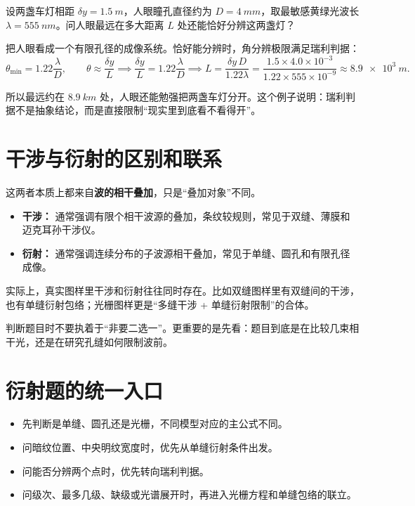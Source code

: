 \documentclass[lang=cn,11pt]{elegantbook}
\begin{document}
\begin{example}[人眼分辨两盏车灯的最远距离]
设两盏车灯相距 \(\delta y=\SI{1.5}{m}\)，人眼瞳孔直径约为 \(D=\SI{4}{mm}\)，取最敏感黄绿光波长 \(\lambda=\SI{555}{nm}\)。问人眼最远在多大距离 \(L\) 处还能恰好分辨这两盏灯？
\end{example}

\begin{solution}
把人眼看成一个有限孔径的成像系统。恰好能分辨时，角分辨极限满足瑞利判据：
\[
\theta_{\min}=1.22\frac{\lambda}{D},\qquad
\theta\approx \frac{\delta y}{L}
\implies
\frac{\delta y}{L}=1.22\frac{\lambda}{D}
\implies
L=\frac{\delta y\,D}{1.22\lambda}
=\frac{1.5\times 4.0\times 10^{-3}}{1.22\times 555\times 10^{-9}}
\approx \SI{8.9e3}{m}.
\]

所以最远约在 \(\SI{8.9}{km}\) 处，人眼还能勉强把两盏车灯分开。这个例子说明：瑞利判据不是抽象结论，而是直接限制“现实里到底看不看得开”。
\end{solution}

\section{干涉与衍射的区别和联系}

这两者本质上都来自\textbf{波的相干叠加}，只是“叠加对象”不同。
\begin{itemize}
  \item \textbf{干涉：} 通常强调有限个相干波源的叠加，条纹较规则，常见于双缝、薄膜和迈克耳孙干涉仪。
  \item \textbf{衍射：} 通常强调连续分布的子波源相干叠加，常见于单缝、圆孔和有限孔径成像。
\end{itemize}

实际上，真实图样里干涉和衍射往往同时存在。比如双缝图样里有双缝间的干涉，也有单缝衍射包络；光栅图样更是“多缝干涉 + 单缝衍射限制”的合体。

\begin{note}
判断题目时不要执着于“非要二选一”。更重要的是先看：题目到底是在比较几束相干光，还是在研究孔缝如何限制波前。
\end{note}

\section{衍射题的统一入口}

\begin{itemize}
  \item 先判断是单缝、圆孔还是光栅，不同模型对应的主公式不同。
  \item 问暗纹位置、中央明纹宽度时，优先从单缝衍射条件出发。
  \item 问能否分辨两个点时，优先转向瑞利判据。
  \item 问级次、最多几级、缺级或光谱展开时，再进入光栅方程和单缝包络的联立。
\end{itemize}
\end{document}
